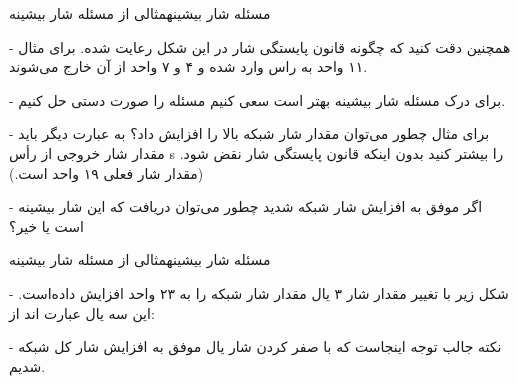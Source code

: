 \begin{itemframe}{مسئله شار بیشینه}{مثالی از مسئله شار بیشینه}
\item[-]
همچنین دقت کنید که چگونه قانون پایستگی شار در این شکل رعایت شده. برای مثال ۱۱ واحد به راس
وارد شده و ۴ و ۷ واحد از آن خارج می‌شوند.
\item[-]
برای درک مسئله شار بیشینه بهتر است سعی کنیم مسئله را صورت دستی حل کنیم.
\item[-]
برای مثال چطور می‌توان مقدار شار شبکه بالا را افزایش داد؟ به عبارت دیگر باید مقدار شار خروجی از رأس s را بیشتر کنید بدون اینکه قانون پایستگی شار نقض شود. (مقدار شار فعلی ۱۹ واحد است.)
\item[-]
اگر موفق به افزایش شار شبکه شدید چطور می‌توان دریافت که این شار بیشینه است یا خیر؟

\end{itemframe}

\begin{itemframe}{مسئله شار بیشینه}{مثالی از مسئله شار بیشینه}
\item[-]
شکل زیر با تغییر مقدار شار ۳ یال مقدار شار شبکه را به ۲۳ واحد افزایش داده‌است. این سه یال عبارت اند از:

\item[-]
نکته جالب توجه اینجاست که با صفر کردن شار یال
موفق به افزایش شار کل شبکه شدیم.
\end{itemframe}